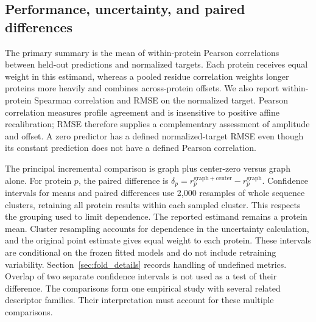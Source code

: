 \documentclass[11pt]{article}
\begin{document}

\subsection{Performance, uncertainty, and paired differences}
The primary summary is the mean of within-protein Pearson correlations between held-out predictions and normalized targets. Each protein receives equal weight in this estimand, whereas a pooled residue correlation weights longer proteins more heavily and combines across-protein offsets. We also report within-protein Spearman correlation and RMSE on the normalized target. Pearson correlation measures profile agreement and is insensitive to positive affine recalibration; RMSE therefore supplies a complementary assessment of amplitude and offset. A zero predictor has a defined normalized-target RMSE even though its constant prediction does not have a defined Pearson correlation.

The principal incremental comparison is graph plus center-zero versus graph alone. For protein $p$, the paired difference is $\delta_p=r_p^{\mathrm{graph+center}}-r_p^{\mathrm{graph}}$. Confidence intervals for means and paired differences use 2,000 resamples of whole sequence clusters, retaining all protein results within each sampled cluster. This respects the grouping used to limit dependence. The reported estimand remains a protein mean. Cluster resampling accounts for dependence in the uncertainty calculation, and the original point estimate gives equal weight to each protein. These intervals are conditional on the frozen fitted models and do not include retraining variability. Section~\ref{sec:fold_details} records handling of undefined metrics. Overlap of two separate confidence intervals is not used as a test of their difference. The comparisons form one empirical study with several related descriptor families. Their interpretation must account for these multiple comparisons.
\end{document}
